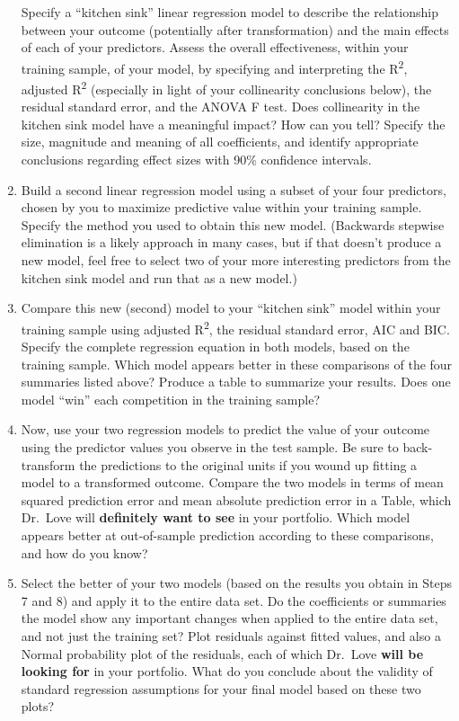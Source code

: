 \documentclass[]{book}
\theoremstyle{definition}
\theoremstyle{definition}
\theoremstyle{definition}
\theoremstyle{remark}
\begin{document}
\begin{enumerate}
  Specify a ``kitchen sink'' linear regression model to describe the
  relationship between your outcome (potentially after transformation)
  and the main effects of each of your predictors. Assess the overall
  effectiveness, within your training sample, of your model, by
  specifying and interpreting the R\textsuperscript{2}, adjusted
  R\textsuperscript{2} (especially in light of your collinearity
  conclusions below), the residual standard error, and the ANOVA F test.
  Does collinearity in the kitchen sink model have a meaningful impact?
  How can you tell? Specify the size, magnitude and meaning of all
  coefficients, and identify appropriate conclusions regarding effect
  sizes with 90\% confidence intervals.
\item
  Build a second linear regression model using a subset of your four
  predictors, chosen by you to maximize predictive value within your
  training sample. Specify the method you used to obtain this new model.
  (Backwards stepwise elimination is a likely approach in many cases,
  but if that doesn't produce a new model, feel free to select two of
  your more interesting predictors from the kitchen sink model and run
  that as a new model.)
\item
  Compare this new (second) model to your ``kitchen sink'' model within
  your training sample using adjusted R\textsuperscript{2}, the residual
  standard error, AIC and BIC. Specify the complete regression equation
  in both models, based on the training sample. Which model appears
  better in these comparisons of the four summaries listed above?
  Produce a table to summarize your results. Does one model ``win'' each
  competition in the training sample?
\item
  Now, use your two regression models to predict the value of your
  outcome using the predictor values you observe in the test sample. Be
  sure to back-transform the predictions to the original units if you
  wound up fitting a model to a transformed outcome. Compare the two
  models in terms of mean squared prediction error and mean absolute
  prediction error in a Table, which Dr.~Love will \textbf{definitely
  want to see} in your portfolio. Which model appears better at
  out-of-sample prediction according to these comparisons, and how do
  you know?
\item
  Select the better of your two models (based on the results you obtain
  in Steps 7 and 8) and apply it to the entire data set. Do the
  coefficients or summaries the model show any important changes when
  applied to the entire data set, and not just the training set? Plot
  residuals against fitted values, and also a Normal probability plot of
  the residuals, each of which Dr.~Love \textbf{will be looking for} in
  your portfolio. What do you conclude about the validity of standard
  regression assumptions for your final model based on these two plots?
\end{enumerate}
\end{document}
